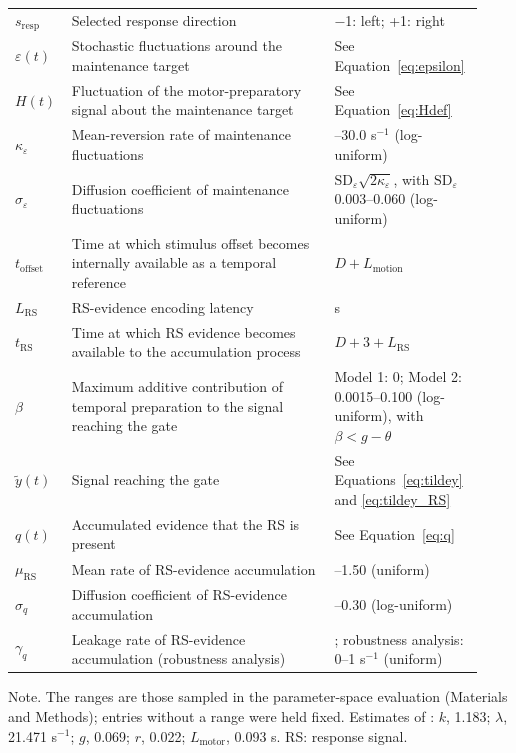 \documentclass[a4paper,11pt]{article}
\theoremstyle{definition}
\newcommand{\1}{\mathbbm{1}}
\begin{document}
\begin{center}
\begin{tabular}{>{\raggedright\arraybackslash}p{0.095\linewidth}>{\raggedright\arraybackslash}p{0.541\linewidth}>{\raggedright\arraybackslash}p{0.294\linewidth}}
$s_{\mathrm{resp}}$ & Selected response direction & $-$1: left; +1: right \\
$\varepsilon(t)$ & Stochastic fluctuations around the maintenance target & See Equation~\eqref{eq:epsilon} \\
$H(t)$ & Fluctuation of the motor-preparatory signal about the maintenance target & See Equation~\eqref{eq:Hdef} \\
$\kappa_{\varepsilon}$ & Mean-reversion rate of maintenance fluctuations & 0.20--30.0 s$^{-1}$ (log-uniform) \\
$\sigma_{\varepsilon}$ & Diffusion coefficient of maintenance fluctuations & $\mathrm{SD}_{\varepsilon}\sqrt{2\kappa_{\varepsilon}}$, with $\mathrm{SD}_{\varepsilon}$ 0.003--0.060 (log-uniform) \\
$t_{\mathrm{offset}}$ & Time at which stimulus offset becomes internally available as a temporal reference & $D+L_{\mathrm{motion}}$ \\
$L_{\mathrm{RS}}$ & RS-evidence encoding latency & 0.200 s \\
$t_{\mathrm{RS}}$ & Time at which RS evidence becomes available to the accumulation process & $D+3+L_{\mathrm{RS}}$ \\
$\beta$ & Maximum additive contribution of temporal preparation to the signal reaching the gate & Model 1: 0; Model 2: 0.0015--0.100 (log-uniform), with $\beta<g-\theta$ \\
$\tilde{y}(t)$ & Signal reaching the gate & See Equations~\eqref{eq:tildey} and \eqref{eq:tildey_RS} \\
$q(t)$ & Accumulated evidence that the RS is present & See Equation~\eqref{eq:q} \\
$\mu_{\mathrm{RS}}$ & Mean rate of RS-evidence accumulation & 0.30--1.50 (uniform) \\
$\sigma_{q}$ & Diffusion coefficient of RS-evidence accumulation & 0.03--0.30 (log-uniform) \\
$\gamma_{q}$ & Leakage rate of RS-evidence accumulation (robustness analysis) & 0; robustness analysis: 0--1 s$^{-1}$ (uniform) \\
\bottomrule
\end{tabular}
\end{center}
Note. The ranges are those sampled in the parameter-space evaluation (Materials and Methods); entries without a range were held fixed. Estimates of \textcite{dendauwGatedCascadeDiffusion2024}: $k$, 1.183; $\lambda$, 21.471 s$^{-1}$; $g$, 0.069; $r$, 0.022; $L_{\mathrm{motor}}$, 0.093 s. RS: response signal.
\end{document}
